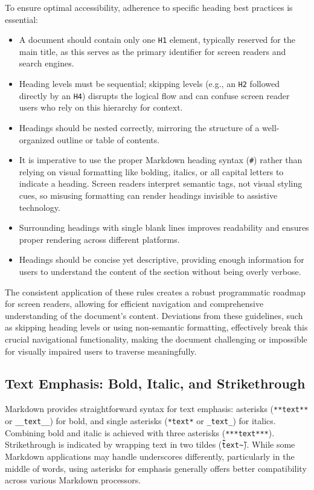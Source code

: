 To ensure optimal accessibility, adherence to specific heading best practices is essential:
\begin{itemize}
    \item A document should contain only one \texttt{H1} element, typically reserved for the main title, as this serves as the primary identifier for screen readers and search engines.\cite{DSU,UNIWeb,GitLabDocs}
    \item Heading levels must be sequential; skipping levels (e.g., an \texttt{H2} followed directly by an \texttt{H4}) disrupts the logical flow and can confuse screen reader users who rely on this hierarchy for context.\cite{DSU,TestDevLab,GitLabDocs,TestPros}
    \item Headings should be nested correctly, mirroring the structure of a well-organized outline or table of contents.\cite{GitLabDocs,LancasterLatex}
    \item It is imperative to use the proper Markdown heading syntax (\texttt{\#}) rather than relying on visual formatting like bolding, italics, or all capital letters to indicate a heading.\cite{DSU,UniversalDesign,TestPros} Screen readers interpret semantic tags, not visual styling cues, so misusing formatting can render headings invisible to assistive technology.\cite{UniversalDesign}
    \item Surrounding headings with single blank lines improves readability and ensures proper rendering across different platforms.\cite{MSPowerShellMarkdown}
    \item Headings should be concise yet descriptive, providing enough information for users to understand the content of the section without being overly verbose.\cite{SmashingMagazine,UNIWeb}
\end{itemize}
The consistent application of these rules creates a robust programmatic roadmap for screen readers, allowing for efficient navigation and comprehensive understanding of the document's content. Deviations from these guidelines, such as skipping heading levels or using non-semantic formatting, effectively break this crucial navigational functionality, making the document challenging or impossible for visually impaired users to traverse meaningfully.

\subsection{Text Emphasis: Bold, Italic, and Strikethrough}
Markdown provides straightforward syntax for text emphasis: asterisks (\texttt{**text**} or \texttt{\_\_text\_\_}) for bold, and single asterisks (\texttt{*text*} or \texttt{\_text\_}) for italics.\cite{MarkdownGuide,MarkdownGuideExtended,MarkdownToolbox} Combining bold and italic is achieved with three asterisks (\texttt{***text***}).\cite{MarkdownGuide} Strikethrough is indicated by wrapping text in two tildes (\texttt{\~\~text\~\~}).\cite{MarkdownGuideExtended} While some Markdown applications may handle underscores differently, particularly in the middle of words, using asterisks for emphasis generally offers better compatibility across various Markdown processors.\cite{MarkdownGuide}

